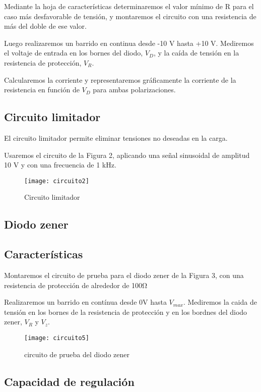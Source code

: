 \documentclass[a4paper,12pt,spanish]{article}
\begin{document}
Mediante la hoja de características determinaremos el valor mínimo de R para el caso más desfavorable de tensión, y montaremos el circuito con una resistencia de más del doble de ese valor.

Luego realizaremos un barrido en continua desde -10 V hasta +10 V. Mediremos el voltaje de entrada en los bornes del diodo, $V_D$, y la caída de tensión en la resistencia de protección, $V_R$.

Calcularemos la corriente y representaremos gráficamente la corriente de la resistencia en función de $V_D$ para ambas polarizaciones.

\subsection*{Circuito limitador}

El circuito limitador permite eliminar tensiones no deseadas en la carga.

Usaremos el circuito de la Figura 2, aplicando una señal sinusoidal de amplitud 10 V y con una frecuencia de 1 kHz.


\begin{figure}[H]
	\centering
	\texttt{[image: circuito2]}
	\caption{Circuito limitador}
	\label{fig:circuito2}
\end{figure}

\subsection{Diodo zener}

\subsection*{Características}

Montaremos el circuito de prueba para el diodo zener de la Figura 3, con una resistencia de protección de alrededor de 100$\si{\ohm}$

Realizaremos un barrido en contínua desde 0V hasta $V_{max}$. Mediremos la caida de tensión en los bornes de la resistencia de protección y en los bordnes del diodo zener, $V_R$ y $V_z$.


\begin{figure}[H]
	\centering
	\texttt{[image: circuito5]}
	\caption{circuito de prueba del diodo zener}
	\label{fig:circuito5}
\end{figure}

\subsection*{Capacidad de regulación}
\end{document}
